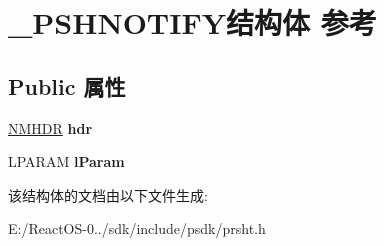 \hypertarget{struct___p_s_h_n_o_t_i_f_y}{}\section{\+\_\+\+P\+S\+H\+N\+O\+T\+I\+F\+Y结构体 参考}
\label{struct___p_s_h_n_o_t_i_f_y}
\subsection*{Public 属性}
\begin{DoxyCompactItemize}
\item 
\mbox{\label{struct___p_s_h_n_o_t_i_f_y_a8729929b803f3431b4e16074941993d9}} 
\hyperlink{structtag_n_m_h_d_r}{N\+M\+H\+DR} {\bfseries hdr}
\item 
\mbox{\label{struct___p_s_h_n_o_t_i_f_y_a6bd6a9c5f04e2cff06853e3c5a410600}} 
L\+P\+A\+R\+AM {\bfseries l\+Param}
\end{DoxyCompactItemize}


该结构体的文档由以下文件生成\+:\begin{DoxyCompactItemize}
\item 
E\+:/\+React\+O\+S-\/0../sdk/include/psdk/prsht.\+h\end{DoxyCompactItemize}
